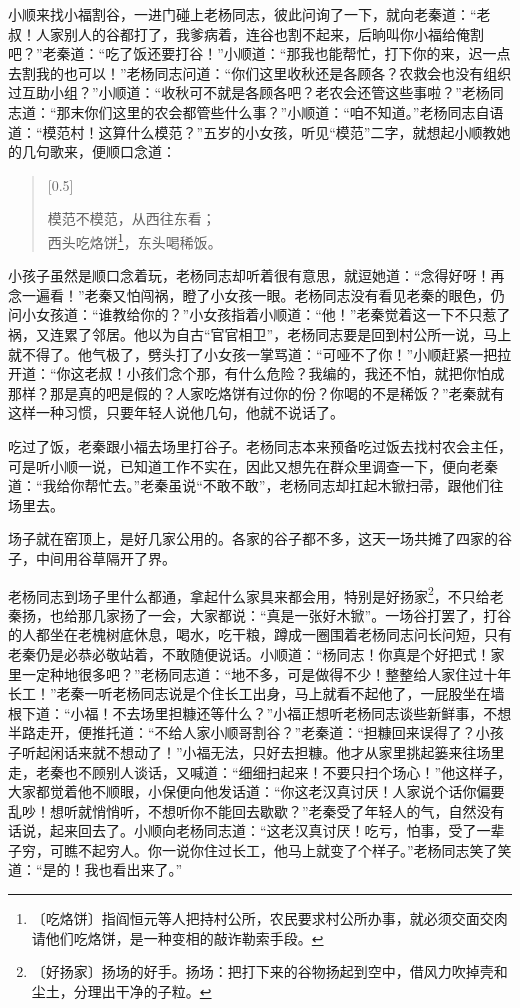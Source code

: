 \documentclass[12pt,UTF-8,openany]{ctexbook}
\begin{document}
\begin{large}
    小顺来找小福割谷，一进门碰上老杨同志，彼此问询了一下，就向老秦道：“老叔！人家别人的谷都打了，我爹病着，连谷也割不起来，后晌叫你小福给俺割吧？”老秦道：“吃了饭还要打谷！”小顺道：“那我也能帮忙，打下你的来，迟一点去割我的也可以！”老杨同志问道：“你们这里收秋还是各顾各？农救会也没有组织过互助小组？”小顺道：“收秋可不就是各顾各吧？老农会还管这些事啦？”老杨同志道：“那末你们这里的农会都管些什么事？”小顺道：“咱不知道。”老杨同志自语道：“模范村！这算什么模范？”五岁的小女孩，听见“模范”二字，就想起小顺教她的几句歌来，便顺口念道：
    
    \begin{verse}[0.5\linewidth]
    
    模范不模范，从西往东看；\\西头吃烙饼\footnote{〔吃烙饼〕指阎恒元等人把持村公所，农民要求村公所办事，就必须交面交肉请他们吃烙饼，是一种变相的敲诈勒索手段。}，东头喝稀饭。
    
    \end{verse}
    
    小孩子虽然是顺口念着玩，老杨同志却听着很有意思，就逗她道：“念得好呀！再念一遍看！”老秦又怕闯祸，瞪了小女孩一眼。老杨同志没有看见老秦的眼色，仍问小女孩道：“谁教给你的？”小女孩指着小顺道：“他！”老秦觉着这一下不只惹了祸，又连累了邻居。他以为自古“官官相卫”，老杨同志要是回到村公所一说，马上就不得了。他气极了，劈头打了小女孩一掌骂道：“可哑不了你！”小顺赶紧一把拉开道：“你这老叔！小孩们念个那，有什么危险？我编的，我还不怕，就把你怕成那样？那是真的吧是假的？人家吃烙饼有过你的份？你喝的不是稀饭？”老秦就有这样一种习惯，只要年轻人说他几句，他就不说话了。
    
    吃过了饭，老秦跟小福去场里打谷子。老杨同志本来预备吃过饭去找村农会主任，可是听小顺一说，已知道工作不实在，因此又想先在群众里调查一下，便向老秦道：“我给你帮忙去。”老秦虽说“不敢不敢”，老杨同志却扛起木锨扫帚，跟他们往场里去。
    
    场子就在窑顶上，是好几家公用的。各家的谷子都不多，这天一场共摊了四家的谷子，中间用谷草隔开了界。
    
    老杨同志到场子里什么都通，拿起什么家具来都会用，特别是好扬家\footnote{〔好扬家〕扬场的好手。扬场：把打下来的谷物扬起到空中，借风力吹掉壳和尘土，分理出干净的子粒。}，不只给老秦扬，也给那几家扬了一会，大家都说：“真是一张好木锨”。一场谷打罢了，打谷的人都坐在老槐树底休息，喝水，吃干粮，蹲成一圈围着老杨同志问长问短，只有老秦仍是必恭必敬站着，不敢随便说话。小顺道：“杨同志！你真是个好把式！家里一定种地很多吧？”老杨同志道：“地不多，可是做得不少！整整给人家住过十年长工！”老秦一听老杨同志说是个住长工出身，马上就看不起他了，一屁股坐在墙根下道：“小福！不去场里担糠还等什么？”小福正想听老杨同志谈些新鲜事，不想半路走开，便推托道：“不给人家小顺哥割谷？”老秦道：“担糠回来误得了？小孩子听起闲话来就不想动了！”小福无法，只好去担糠。他才从家里挑起篓来往场里走，老秦也不顾别人谈话，又喊道：“细细扫起来！不要只扫个场心！”他这样子，大家都觉着他不顺眼，小保便向他发话道：“你这老汉真讨厌！人家说个话你偏要乱吵！想听就悄悄听，不想听你不能回去歇歇？”老秦受了年轻人的气，自然没有话说，起来回去了。小顺向老杨同志道：“这老汉真讨厌！吃亏，怕事，受了一辈子穷，可瞧不起穷人。你一说你住过长工，他马上就变了个样子。”老杨同志笑了笑道：“是的！我也看出来了。”
    

\end{large}
\end{document}
